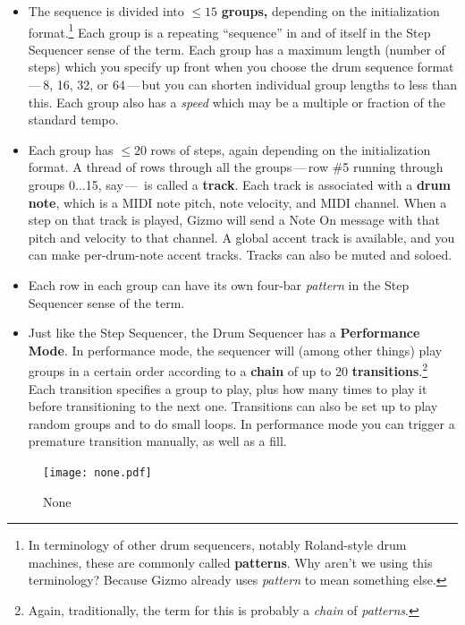 \documentclass{article}
\begin{document}
\begin{itemize} 
\item The sequence is divided into \(\leq 15\) {\bf groups,} depending on the initialization format.\footnote{In terminology of other drum sequencers, notably Roland-style drum machines, these are commonly called {\bf patterns}.  Why aren't we using this terminology?  Because Gizmo already uses {\it pattern} to mean something else.} Each group is a repeating ``sequence'' in and of itself in the Step Sequencer sense of the term.  Each group has a maximum length (number of steps) which you specify up front when you choose the drum sequence format\,---\,8, 16, 32, or 64\,---\,but you can shorten individual group lengths to less than this.  Each group also has a {\it speed} which may be a multiple or fraction of the standard tempo.
\item Each group has \(\leq 20\) rows of steps, again depending on the initialization format.  A thread of rows through all the groups\,---\,row \#5 running through groups 0...15, say\,---\, is called a {\bf track}.  Each track is associated with a {\bf drum note}, which is a MIDI note pitch, note velocity, and MIDI channel.  When a step on that track is played, Gizmo will send a Note On message with that pitch and velocity to that channel.  A global accent track is available, and you can make per-drum-note accent tracks. Tracks can also be muted and soloed.
\item Each row in each group can have its own four-bar {\it pattern} in the Step Sequencer sense of the term.
\item Just like the Step Sequencer, the Drum Sequencer has a {\bf Performance Mode}.  In performance mode, the sequencer will (among other things) play groups in a certain order according to a {\bf chain} of up to 20 {\bf transitions}.\footnote{Again, traditionally, the term for this is probably a {\it chain} of {\it patterns}.}  Each transition specifies a group to play, plus how many times to play it before transitioning to the next one.  Transitions can also be set up to play random groups and to do small loops.  In performance mode you can trigger a premature transition manually, as well as a fill.
\end{itemize}

\begin{figure}
\texttt{[image: none.pdf]}
\vspace{-2em}\caption{\small None}\vspace{-1em}
\end{figure}
\end{document}
